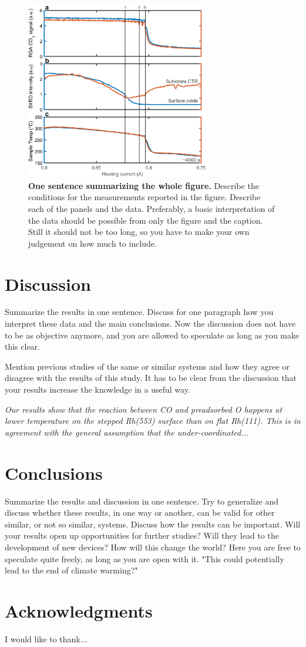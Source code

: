 \documentclass[aps,prl,groupedaddress,twocolumn]{revtex4-1}
\begin{document}
\begin{figure}
\includegraphics[width=8cm]{rh111-sxrd.eps}
\caption{\label{Fig:1} \textbf{One sentence summarizing the whole figure.} Describe the conditions for the measurements reported in the figure. Describe each of the panels and the data. Preferably, a basic interpretation of the data should be possible from only the figure and the caption. Still it should not be too long, so you have to make your own judgement on how much to include.}
\end{figure}

\section{Discussion}
Summarize the results in one sentence. Discuss for one paragraph how you interpret these data and the main conclusions. Now the discussion does not have to be as objective anymore, and you are allowed to speculate as long as you make this clear.

Mention previous studies of the same or similar systems and how they agree or disagree with the results of this study. It has to be clear from the discussion that your results increase the knowledge in a useful way.

\textit{Our results show that the reaction between CO and preadsorbed O happens at lower temperature on the stepped Rh(553) surface than on flat Rh(111). This is in agreement with the general assumption that the under-coordinated...\cite{Lundgren_2008}}

\section{Conclusions}

Summarize the results and discussion in one sentence. Try to generalize and discuss whether these results, in one way or another, can be valid for other similar, or not so similar, systems.
Discuss how the results can be important. Will your results open up opportunities for further studies? Will they lead to the development of new devices? How will this change the world? Here you are free to speculate quite freely, as long as you are open with it. "This could potentially lead to the end of climate warming?"


\section{Acknowledgments}
I would like to thank...



\end{document}
